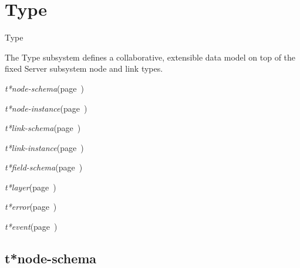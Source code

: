 \chapter{Type}
\label{Type}

\begin{description}
\item [Name:]  Type

\item [Description:]

The Type subsystem defines a collaborative, extensible
data model on top of the fixed Server subsystem node
and link types.  

\item [Public-classes:]
\item {\sl t*node-schema}\hfill(page~\pageref{t*node-schema})
\item {\sl t*node-instance}\hfill(page~\pageref{t*node-instance})

\item {\sl t*link-schema}\hfill(page~\pageref{t*link-schema})
\item {\sl t*link-instance}\hfill(page~\pageref{t*link-instance})

\item {\sl t*field-schema}\hfill(page~\pageref{t*field-schema})

\item {\sl t*layer}\hfill(page~\pageref{t*layer})

\item {\sl t*error}\hfill(page~\pageref{t*error})
\item {\sl t*event}\hfill(page~\pageref{t*event})

\end{description}
\horizontalline

\section{t*node-schema}
\label{t*node-schema}

